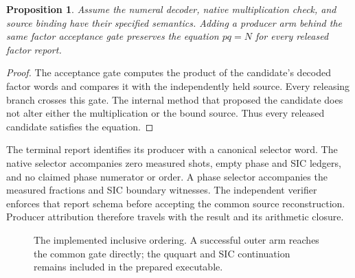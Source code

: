\documentclass[12pt]{article}
\newtheorem{proposition}{Proposition}
\begin{document}
\begin{proposition}
Assume the numeral decoder, native multiplication check, and source binding have their specified semantics. Adding a producer arm behind the same factor acceptance gate preserves the equation $pq=N$ for every released factor report.
\end{proposition}
\begin{proof}
The acceptance gate computes the product of the candidate's decoded factor words and compares it with the independently held source. Every releasing branch crosses this gate. The internal method that proposed the candidate does not alter either the multiplication or the bound source. Thus every released candidate satisfies the equation.
\end{proof}

The terminal report identifies its producer with a canonical selector word. The native selector accompanies zero measured shots, empty phase and SIC ledgers, and no claimed phase numerator or order. A phase selector accompanies the measured fractions and SIC boundary witnesses. The independent verifier enforces that report schema before accepting the common source reconstruction. Producer attribution therefore travels with the result and its arithmetic closure.

\begin{figure}[ht]
\centering
{}
\caption{The implemented inclusive ordering. A successful outer arm reaches the common gate directly; the ququart and SIC continuation remains included in the prepared executable.}
\end{figure}
\end{document}
